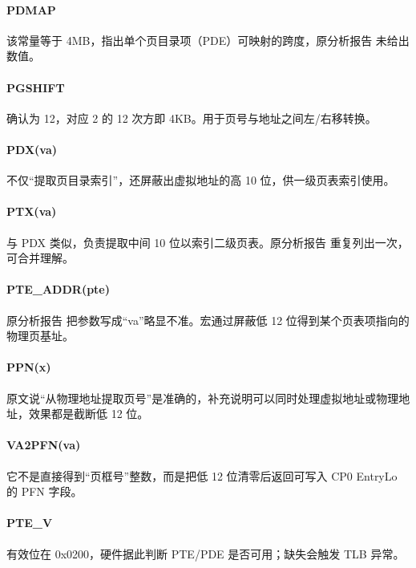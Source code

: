 \documentclass[12pt,oneside]{ctexbook}
\begin{document}
\paragraph{PDMAP}
该常量等于 4MB，指出单个页目录项（PDE）可映射的跨度，原分析报告 未给出数值。

\paragraph{PGSHIFT}
确认为 12，对应 2 的 12 次方即 4KB。用于页号与地址之间左/右移转换。

\paragraph{PDX(va)}
不仅“提取页目录索引”，还屏蔽出虚拟地址的高 10 位，供一级页表索引使用。

\paragraph{PTX(va)}
与 PDX 类似，负责提取中间 10 位以索引二级页表。原分析报告 重复列出一次，可合并理解。

\paragraph{PTE\_ADDR(pte)}
原分析报告 把参数写成“va”略显不准。宏通过屏蔽低 12 位得到某个页表项指向的物理页基址。

\paragraph{PPN(x)}
原文说“从物理地址提取页号”是准确的，补充说明可以同时处理虚拟地址或物理地址，效果都是截断低 12 位。

\paragraph{VA2PFN(va)}
它不是直接得到“页框号”整数，而是把低 12 位清零后返回可写入 CP0 EntryLo 的 PFN 字段。

\paragraph{PTE\_V}
有效位在 0x0200，硬件据此判断 PTE/PDE 是否可用；缺失会触发 TLB 异常。
\end{document}
